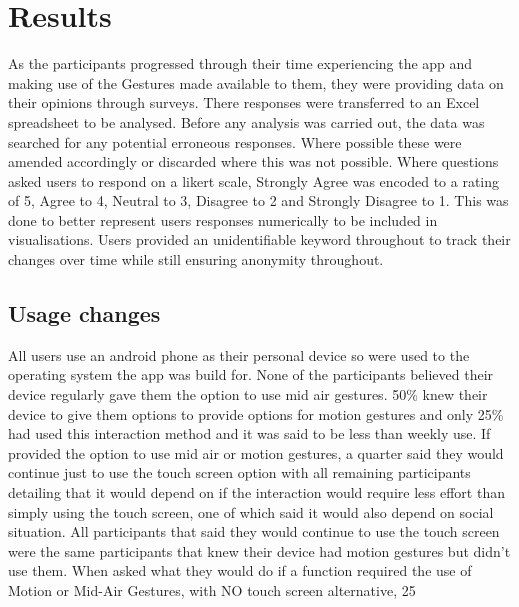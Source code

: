 \documentclass{l4proj}
\begin{document}
\chapter{Results} 
As the participants progressed through their time experiencing the app and making use of the Gestures made available to them, they were providing data on their opinions through surveys. There responses were transferred to an Excel spreadsheet to be analysed. Before any analysis was carried out, the data was searched for any potential erroneous responses. Where possible these were amended accordingly or discarded where this was not possible. Where questions asked users to respond on a likert scale, Strongly Agree was encoded to a rating of 5, Agree to 4, Neutral to 3, Disagree to 2 and Strongly Disagree to 1. This was done to better represent users responses numerically to be included in visualisations. Users provided an unidentifiable keyword throughout to track their changes over time while still ensuring anonymity throughout. 

\section{Usage changes}
All users use an android phone as their personal device so were used to the operating system the app was build for. None of the participants believed their device regularly gave them the option to use mid air gestures. 50\% knew their device to give them options to provide options for motion gestures and only 25\% had used this interaction method and it was said to be less than weekly use. If provided the option to use mid air or motion gestures, a quarter said they would continue just to use the touch screen option with all remaining participants detailing that it would depend on if the interaction would require less effort than simply using the touch screen, one of which said it would also depend on social situation. All participants that said they would continue to use the touch screen were the same participants that knew their device had motion gestures but didn't use them. When asked what they would do if a function required the use of Motion or Mid-Air Gestures, with NO touch screen alternative, 25%
\end{document}
